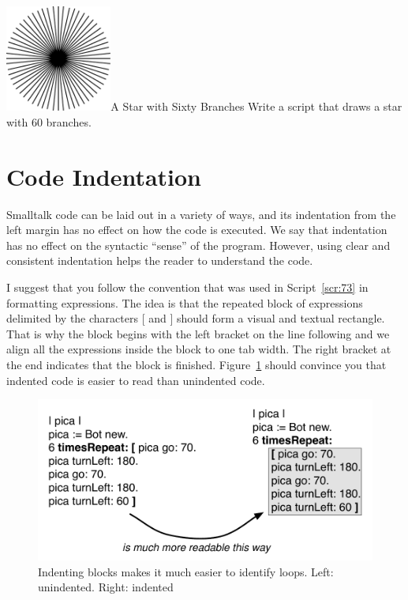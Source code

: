 \documentclass[a4paper,10pt,twoside]{book}
\begin{document}
\begin{exofigwithsizeandtitle}[0.65]{\includegraphics[width=3.5cm]{loopStar60}}{A Star with Sixty Branches}\label{xp:71}
Write a script that draws a star with 60 branches. 
\end{exofigwithsizeandtitle}

\section{Code Indentation} 

Smalltalk code can be laid out in a variety of ways, and its indentation from the left margin has 
no effect on how the code is executed. We say that indentation has no effect on the syntactic 
``sense'' of the program. However, using clear and consistent indentation helps the reader to 
understand the code. 


I suggest that you follow the convention that was used in Script~\ref{scr:73} in formatting 
 expressions. The idea is that the repeated block of expressions delimited 
by the characters [ and ] should form a visual and textual rectangle. That is why the block 
begins with the left bracket on the line following  and we align all the expressions 
inside the block to one tab width. The right bracket at the end indicates that the block is finished. Figure~\ref{fig:71} should convince you that indented code is easier to read than unindented 
code. 

\begin{figure}[htbp]
	\centering
		\includegraphics[width=.9\linewidth]{indent}
	\caption{Indenting blocks makes it much easier to identify loops. Left: unindented. 
Right: indented}
	\label{fig:71}
\end{figure}
\end{document}
